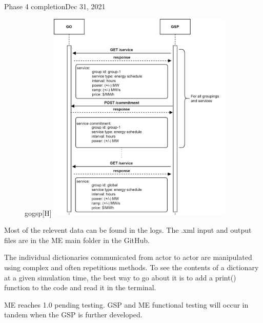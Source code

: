 \begin{entry}{Phase 4 completion}{Dec 31, 2021}
    \data

    \begin{figure}{gogsp}[H]
        \centering
        \includegraphics[height=4in]{Fall2021/Figures/goGspcomms}
        \label{fig:gogsp}
    \end{figure}

    Most of the relevent data can be found in the logs. The .xml input and output files are in the ME main folder in
    the GitHub.

    The individual dictionaries communicated from actor to actor are manipulated using complex and often repetitious
    methods. To see the contents of a dictionary at a given simulation time, the best way to go about it is to add
    a print() function to the code and read it in the terminal.

    \results
    
    ME reaches 1.0 pending testing. GSP and ME functional testing will occur in tandem when the GSP is further developed.


\end{entry}


